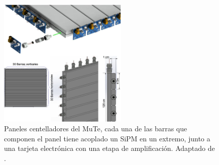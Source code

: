 \begin{figure}[h!]
\begin{centering}
  \includegraphics[width=0.55\textwidth]{Images/Panel.eps}
  \caption{Paneles centelladores del MuTe, cada una de las barras que componen el panel tiene acoplado un SiPM en un extremo, junto a una tarjeta electrónica con una etapa de amplificación. Adaptado de \citep{MuTe_mec}.}
  \label{fig:Hodoscopio}
  \par\end{centering}
\end{figure}